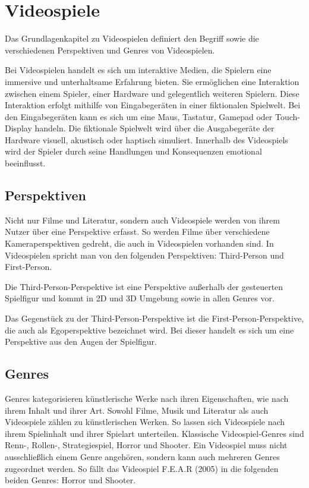 \chapter{Videospiele}
\label{chap:videospiele}

Das Grundlagenkapitel zu Videospielen definiert den Begriff sowie die verschiedenen Perspektiven und Genres von Videospielen.

Bei Videospielen handelt es sich um interaktive Medien, die Spielern eine immersive und unterhaltsame Erfahrung bieten. Sie erm\"{o}glichen eine Interaktion zwischen einem Spieler, einer Hardware und gelegentlich weiteren Spielern. Diese Interaktion erfolgt mithilfe von Eingabeger\"{a}ten in einer fiktionalen Spielwelt. Bei den Eingabeger\"{a}ten kann es sich um eine Maus, Tastatur, Gamepad oder Touch-Display handeln. Die fiktionale Spielwelt wird \"{u}ber die Ausgabeger\"{a}te der Hardware visuell, akustisch oder haptisch simuliert. Innerhalb des Videospiels wird der Spieler durch seine Handlungen und Konsequenzen emotional beeinflusst. \autocite{Bergonse}

\section{Perspektiven}
\label{chap:perspektiven}

Nicht nur Filme und Literatur, sondern auch Videospiele werden von ihrem Nutzer \"{u}ber eine Perspektive erfasst. So werden Filme \"{u}ber verschiedene Kameraperspektiven gedreht, die auch in Videospielen vorhanden sind. In Videospielen spricht man von den folgenden Perspektiven: Third-Person und First-Person.

Die Third-Person-Perspektive ist eine Perspektive au\ss{}erhalb der gesteuerten Spielfigur und kommt in 2D und 3D Umgebung sowie in allen Genres vor.

Das Gegenst\"{u}ck zu der Third-Person-Perspektive ist die First-Person-Perspektive, die auch als Egoperspektive bezeichnet wird. Bei dieser handelt es sich um eine Perspektive aus den Augen der Spielfigur.

\section{Genres}
\label{chap:genres}

Genres kategorisieren k\"{u}nstlerische Werke nach ihren Eigenschaften, wie nach ihrem Inhalt und ihrer Art. Sowohl Filme, Musik und Literatur als auch Videospiele z\"{a}hlen zu k\"{u}nstlerischen Werken. So lassen sich Videospiele nach ihrem Spielinhalt und ihrer Spielart unterteilen. Klassische Videospiel-Genres sind Renn-, Rollen-, Strategiespiel, Horror und Shooter. Ein Videospiel muss nicht ausschlie\ss{}lich einem Genre angeh\"{o}ren, sondern kann auch mehreren Genres zugeordnet werden. So f\"{a}llt das Videospiel F.E.A.R (2005) in die folgenden beiden Genres: Horror und Shooter.

